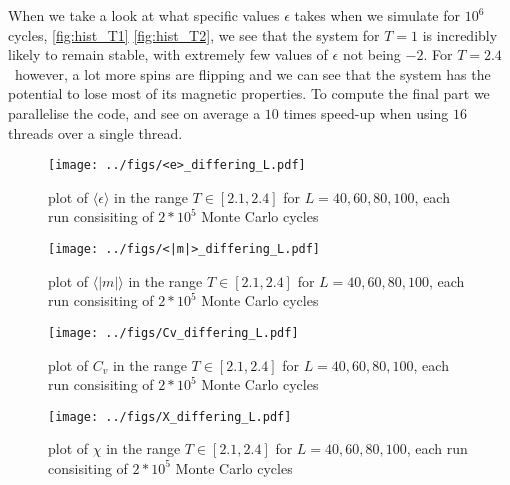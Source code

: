 \documentclass[english,notitlepage,reprint,nofootinbib]{revtex4-1}  %
\begin{document}
When we take a look at what specific values $\epsilon$ takes when we simulate for $10^6$ cycles, \ref{fig:hist_T1} \ref{fig:hist_T2}, we see that the system for $T=1$ is incredibly likely to remain stable, with extremely few values of $\epsilon$ not being $-2$. For $T=2.4$ however, a lot more spins are flipping and we can see that the system has the potential to lose most of its magnetic properties.
\newline
To compute the final part we parallelise the code, and see on average a $10$ times speed-up when using $16$ threads over a single thread.
\begin{figure}[H]
	\centering
	\texttt{[image: ../figs/<e>\_differing\_L.pdf]} %
	\caption{plot of $\langle\epsilon\rangle$ in the range $T \in [2.1,2.4]$ for $L=40,60,80,100$, each run consisiting of $2*10^5$ Monte Carlo cycles}
	\label{fig:e_differing}
\end{figure}

\begin{figure}[H]
	\centering
	\texttt{[image: ../figs/<|m|>\_differing\_L.pdf]} %
	\caption{plot of $\langle|m|\rangle$ in the range $T \in [2.1,2.4]$ for $L=40,60,80,100$, each run consisiting of $2*10^5$ Monte Carlo cycles}
	\label{fig:m_differing}
\end{figure}

\begin{figure}[H]
	\centering
	\texttt{[image: ../figs/Cv\_differing\_L.pdf]} %
	\caption{plot of $C_v$ in the range $T \in [2.1,2.4]$ for $L=40,60,80,100$, each run consisiting of $2*10^5$ Monte Carlo cycles}
	\label{fig:Cv_diff_l}
\end{figure}

\begin{figure}[H]
	\centering
	\texttt{[image: ../figs/X\_differing\_L.pdf]} %
	\caption{plot of $\chi$ in the range $T \in [2.1,2.4]$ for $L=40,60,80,100$, each run consisiting of $2*10^5$ Monte Carlo cycles}
	\label{fig:X_diff_l}
\end{figure}
\end{document}
